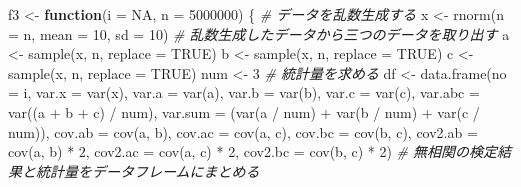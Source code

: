 \documentclass[a4paper]{tufte-handout}
\newenvironment{Shaded}{}{}
\newcommand{\AttributeTok}[1]{\textcolor[rgb]{0.49,0.56,0.16}{#1}}
\newcommand{\CommentTok}[1]{\textcolor[rgb]{0.38,0.63,0.69}{\textit{#1}}}
\newcommand{\ConstantTok}[1]{\textcolor[rgb]{0.53,0.00,0.00}{#1}}
\newcommand{\ControlFlowTok}[1]{\textcolor[rgb]{0.00,0.44,0.13}{\textbf{#1}}}
\newcommand{\DecValTok}[1]{\textcolor[rgb]{0.25,0.63,0.44}{#1}}
\newcommand{\FunctionTok}[1]{\textcolor[rgb]{0.02,0.16,0.49}{#1}}
\newcommand{\NormalTok}[1]{#1}
\newcommand{\OtherTok}[1]{\textcolor[rgb]{0.00,0.44,0.13}{#1}}
\newcommand{\SpecialCharTok}[1]{\textcolor[rgb]{0.25,0.44,0.63}{#1}}
\begin{document}
\begin{Shaded}
\begin{Highlighting}[numbers=left,,]
\NormalTok{f3 }\OtherTok{\textless{}{-}} \ControlFlowTok{function}\NormalTok{(}\AttributeTok{i =} \ConstantTok{NA}\NormalTok{, }\AttributeTok{n =} \DecValTok{5000000}\NormalTok{) \{}
  \CommentTok{\# データを乱数生成する}
\NormalTok{  x }\OtherTok{\textless{}{-}} \FunctionTok{rnorm}\NormalTok{(}\AttributeTok{n =}\NormalTok{ n, }\AttributeTok{mean =} \DecValTok{10}\NormalTok{, }\AttributeTok{sd =} \DecValTok{10}\NormalTok{)}
  \CommentTok{\# 乱数生成したデータから三つのデータを取り出す}
\NormalTok{  a }\OtherTok{\textless{}{-}} \FunctionTok{sample}\NormalTok{(x, n, }\AttributeTok{replace =} \ConstantTok{TRUE}\NormalTok{)}
\NormalTok{  b }\OtherTok{\textless{}{-}} \FunctionTok{sample}\NormalTok{(x, n, }\AttributeTok{replace =} \ConstantTok{TRUE}\NormalTok{)}
\NormalTok{  c }\OtherTok{\textless{}{-}} \FunctionTok{sample}\NormalTok{(x, n, }\AttributeTok{replace =} \ConstantTok{TRUE}\NormalTok{)}
\NormalTok{  num }\OtherTok{\textless{}{-}} \DecValTok{3}
  \CommentTok{\# 統計量を求める}
\NormalTok{  df }\OtherTok{\textless{}{-}} \FunctionTok{data.frame}\NormalTok{(}\AttributeTok{no =}\NormalTok{ i,}
                   \AttributeTok{var.x =} \FunctionTok{var}\NormalTok{(x), }
                   \AttributeTok{var.a =} \FunctionTok{var}\NormalTok{(a), }\AttributeTok{var.b =} \FunctionTok{var}\NormalTok{(b), }\AttributeTok{var.c =} \FunctionTok{var}\NormalTok{(c),}
                   \AttributeTok{var.abc =} \FunctionTok{var}\NormalTok{((a }\SpecialCharTok{+}\NormalTok{ b }\SpecialCharTok{+}\NormalTok{ c) }\SpecialCharTok{/}\NormalTok{ num),}
                   \AttributeTok{var.sum =}\NormalTok{ (}\FunctionTok{var}\NormalTok{(a }\SpecialCharTok{/}\NormalTok{ num) }\SpecialCharTok{+} \FunctionTok{var}\NormalTok{(b }\SpecialCharTok{/}\NormalTok{ num) }\SpecialCharTok{+} \FunctionTok{var}\NormalTok{(c }\SpecialCharTok{/}\NormalTok{ num)),}
                   \AttributeTok{cov.ab =} \FunctionTok{cov}\NormalTok{(a, b), }\AttributeTok{cov.ac =} \FunctionTok{cov}\NormalTok{(a, c), }\AttributeTok{cov.bc =} \FunctionTok{cov}\NormalTok{(b, c),}
                   \AttributeTok{cov2.ab =} \FunctionTok{cov}\NormalTok{(a, b) }\SpecialCharTok{*} \DecValTok{2}\NormalTok{, }\AttributeTok{cov2.ac =} \FunctionTok{cov}\NormalTok{(a, c) }\SpecialCharTok{*} \DecValTok{2}\NormalTok{, }\AttributeTok{cov2.bc =} \FunctionTok{cov}\NormalTok{(b, c) }\SpecialCharTok{*} \DecValTok{2}\NormalTok{)}
  \CommentTok{\# 無相関の検定結果と統計量をデータフレームにまとめる}

\end{Highlighting}
\end{Shaded}
\end{document}
